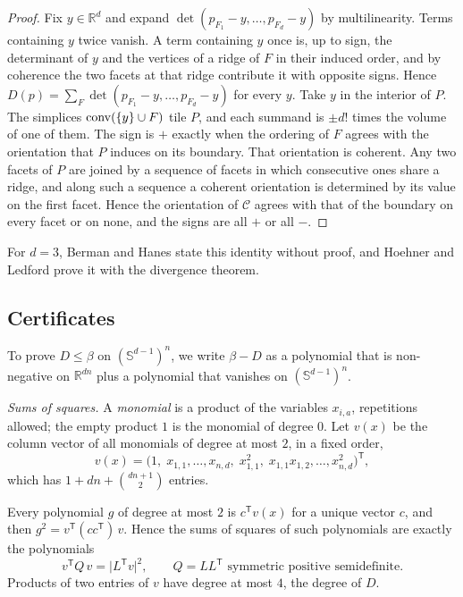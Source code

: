 \begin{proof}
  Fix $y \in \mathbb{R}^{d}$ and expand
  $\det(p_{F_{1}} - y, \ldots, p_{F_{d}} - y)$ by multilinearity. Terms
  containing $y$ twice vanish. A term containing $y$ once is, up to sign, the
  determinant of $y$ and the vertices of a ridge of $F$ in their induced
  order, and by coherence the two facets at that ridge contribute it with
  opposite signs. Hence
  $D(p) = \sum_{F} \det(p_{F_{1}} - y, \ldots, p_{F_{d}} - y)$ for every $y$.
  Take $y$ in the interior of $P$. The simplices $\operatorname{conv}(\{y\} \cup F)$ tile
  $P$, and each summand is $\pm d!$ times the volume of one of them. The sign
  is $+$ exactly when the ordering of $F$ agrees with the orientation that $P$
  induces on its boundary. That orientation is coherent. Any two facets of
  $P$ are joined by a sequence of facets in which consecutive ones share a
  ridge, and along such a sequence a coherent orientation is determined by
  its value on the first facet. Hence the orientation of $\mathcal{C}$ agrees
  with that of the boundary on every facet or on none, and the signs are all
  $+$ or all $-$.
\end{proof}

\begin{remark}
  For $d = 3$, Berman and Hanes state this identity without proof, and Hoehner
  and Ledford prove it with the divergence theorem.
\end{remark}

\subsection{Certificates}

To prove $D \leq \beta$ on $(\mathbb{S}^{d-1})^{n}$, we write $\beta - D$ as a
polynomial that is non-negative on $\mathbb{R}^{dn}$ plus a polynomial that
vanishes on $(\mathbb{S}^{d-1})^{n}$.

\emph{Sums of squares.} A \emph{monomial} is a product of the variables
$x_{i,a}$, repetitions allowed; the empty product $1$ is the monomial of
degree $0$. Let $v(x)$ be the column vector of all monomials of degree at
most $2$, in a fixed order,
\[
  v(x) = \bigl(1,\; x_{1,1}, \ldots, x_{n,d},\; x_{1,1}^{2},\;
  x_{1,1}x_{1,2}, \ldots, x_{n,d}^{2}\bigr)^{\mathsf{T}},
\]
which has $1 + dn + \binom{dn+1}{2}$ entries.

Every polynomial $g$ of degree at most $2$ is $c^{\mathsf{T}} v(x)$ for a
unique vector $c$, and then $g^{2} = v^{\mathsf{T}} (cc^{\mathsf{T}})\, v$.
Hence the sums of squares of such polynomials are exactly the polynomials
\[
  v^{\mathsf{T}} Q\, v = \lvert L^{\mathsf{T}} v\rvert^{2},
  \qquad Q = LL^{\mathsf{T}} \text{ symmetric positive semidefinite}.
\]
Products of two entries of $v$ have degree at most $4$, the degree of $D$.

